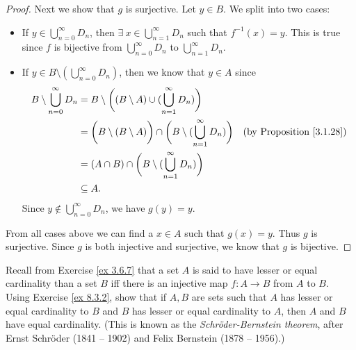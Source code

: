 \begin{proof}
    Next we show that \(g\) is surjective.
    Let \(y \in B\).
    We split into two cases:
    \begin{itemize}
        \item If \(y \in \bigcup_{n = 0}^\infty D_n\), then \(\exists\ x \in \bigcup_{n = 1}^\infty D_n\) such that \(f^{-1}(x) = y\).
              This is true since \(f\) is bijective from \(\bigcup_{n = 0}^\infty D_n\) to \(\bigcup_{n = 1}^\infty D_n\).
        \item If \(y \in B \setminus (\bigcup_{n = 0}^\infty D_n)\), then we know that \(y \in A\) since
              \begin{align*}
                  B \setminus \bigcup_{n = 0}^\infty D_n & = B \setminus \bigg((B \setminus A) \cup (\bigcup_{n = 1}^\infty D_n)\bigg)                                                                \\
                                                         & = \bigg(B \setminus (B \setminus A)\bigg) \cap \bigg(B \setminus (\bigcup_{n = 1}^\infty D_n)\bigg) & \text{(by Proposition \ref{3.1.28})} \\
                                                         & = (A \cap B) \cap \bigg(B \setminus (\bigcup_{n = 1}^\infty D_n)\bigg)                                                                     \\
                                                         & \subseteq A.
              \end{align*}
              Since \(y \notin \bigcup_{n = 0}^\infty D_n\), we have \(g(y) = y\).
    \end{itemize}
    From all cases above we can find a \(x \in A\) such that \(g(x) = y\).
    Thus \(g\) is surjective.
    Since \(g\) is both injective and surjective, we know that \(g\) is bijective.
\end{proof}

\begin{exercise}\label{ex 8.3.3}
    Recall from Exercise \ref{ex 3.6.7} that a set \(A\) is said to have lesser or equal cardinality than a set \(B\) iff there is an injective map \(f : A \to B\) from \(A\) to \(B\).
    Using Exercise \ref{ex 8.3.2}, show that if \(A, B\) are sets such that \(A\) has lesser or equal cardinality to \(B\) and \(B\) has lesser or equal cardinality to \(A\), then \(A\) and \(B\) have equal cardinality.
    (This is known as the \emph{Schröder-Bernstein theorem}, after Ernst Schröder (1841 -- 1902) and Felix Bernstein (1878 -- 1956).)
\end{exercise}


